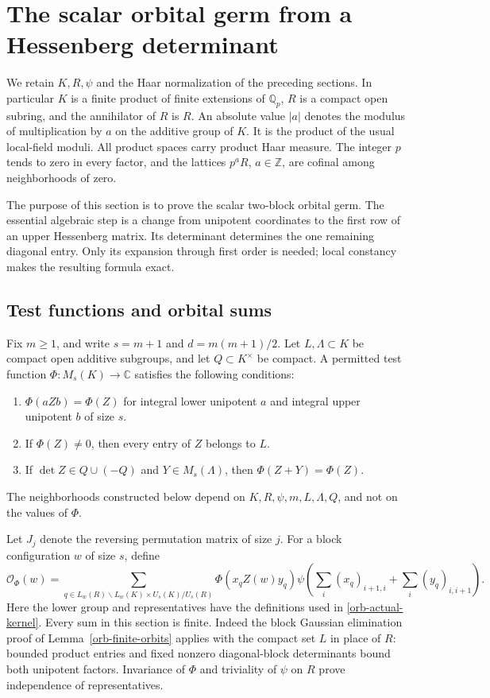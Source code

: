 \section{The scalar orbital germ from a Hessenberg determinant}
\label{sec:theta-scalar-germ}

We retain $K,R,\psi$ and the Haar normalization of the preceding
sections.  In particular $K$ is a finite product of finite extensions
of $\mathbb Q_p$, $R$ is a compact open subring, and the annihilator
of $R$ is $R$.  An absolute value $|a|$ denotes the modulus of
multiplication by $a$ on the additive group of $K$.  It is the
product of the usual local-field moduli.  All product spaces carry
product Haar measure.  The integer $p$ tends to zero in every
factor, and the lattices $p^aR$, $a\in\mathbb Z$, are cofinal among
neighborhoods of zero.

The purpose of this section is to prove the scalar two-block
orbital germ.  The essential algebraic step is a change from
unipotent coordinates to the first row of an upper Hessenberg
matrix.  Its determinant determines the one remaining diagonal
entry.  Only its expansion through first order is needed; local
constancy makes the resulting formula exact.

\subsection{Test functions and orbital sums}

Fix $m\ge1$, and write $s=m+1$ and $d=m(m+1)/2$.
Let $L,\Lambda\subset K$ be compact open additive subgroups,
and let $Q\subset K^\times$ be compact.  A permitted test function
$\Phi:M_s(K)\to\mathbb C$ satisfies the following conditions:
\begin{enumerate}
\item $\Phi(aZb)=\Phi(Z)$ for integral lower unipotent $a$ and
integral upper unipotent $b$ of size $s$.
\item If $\Phi(Z)\ne0$, then every entry of $Z$ belongs to $L$.
\item If $\det Z\in Q\cup(-Q)$ and $Y\in M_s(\Lambda)$, then
$\Phi(Z+Y)=\Phi(Z)$.
\end{enumerate}
The neighborhoods constructed below depend on $K,R,\psi,m,L,
\Lambda,Q$, and not on the values of $\Phi$.

Let $J_j$ denote the reversing permutation matrix of size $j$.
For a block configuration $w$ of size $s$, define
\[
 \mathcal O_\Phi(w)=
 \sum_{q\in L_w(R)\backslash L_w(K)\times U_s(K)/U_s(R)}
       \Phi(x_qZ(w)y_q)
       \psi\left(\sum_i(x_q)_{i+1,i}
                    +\sum_i(y_q)_{i,i+1}\right).
\]
Here the lower group and representatives have the definitions
used in \eqref{orb-actual-kernel}.  Every sum in this section is
finite.  Indeed the block Gaussian elimination proof of
Lemma~\ref{orb-finite-orbits} applies with the compact set $L$
in place of $R$: bounded product entries and fixed nonzero
diagonal-block determinants bound both unipotent factors.
Invariance of $\Phi$ and triviality of $\psi$ on $R$ prove
independence of representatives.

